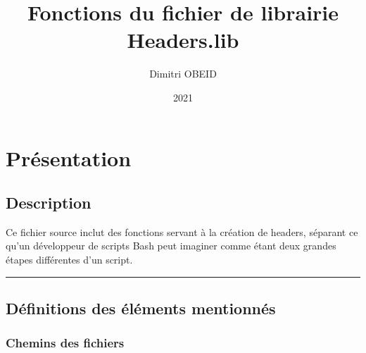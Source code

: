 \documentclass[a4paper,10pt]{article}
\title{\color{sec1}Fonctions du fichier de librairie \color{path}Headers.lib}\color{text}
\author{Dimitri OBEID}
\date{2021}
\begin{document}
\maketitle
\newpage

\hypertarget{contents}{}
\tableofcontents
\newpage

\color{sec1}
\section{Présentation}\color{text}

\color{sec2}
\subsection{Description}\color{text}

\begin{justify}
    Ce fichier source inclut des fonctions servant à la création de headers, séparant ce qu'un développeur de scripts Bash peut imaginer comme étant deux grandes étapes différentes d'un script.
\end{justify}




\color{sec2}\par\noindent\rule{\textwidth}{0.4pt}\color{text}

\color{sec2}
\subsection{Définitions des éléments mentionnés}\color{text}

\color{sec3}
\subsubsection{Chemins des fichiers}\color{text}
\end{document}
